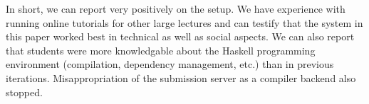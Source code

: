 In short, we can report very positively on the setup.
We have experience with running online tutorials for other large lectures and can testify that
the system in this paper worked best in technical as well as social aspects.
We can also report that students were more knowledgable
about the Haskell programming environment (compilation, dependency management, etc.) than in previous iterations.
Misappropriation of the submission server as a compiler backend also stopped.

